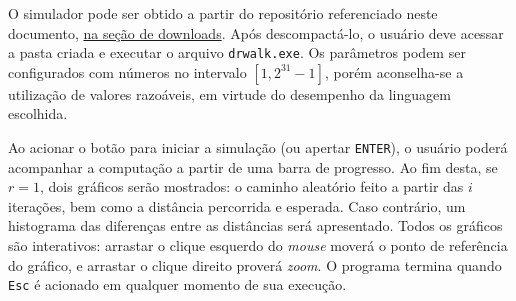 \documentclass{article}
\begin{document}
O simulador pode ser obtido a partir do repositório referenciado neste
documento, \href{https://github.com/zambonin/UFSC-INE5425/releases}{na seção de
downloads}. Após descompactá-lo, o usuário deve acessar a pasta criada e
executar o arquivo \texttt{drwalk.exe}. Os parâmetros podem ser configurados
com números no intervalo $[1, 2^{31} - 1]$, porém aconselha-se a utilização de
valores razoáveis, em virtude do desempenho da linguagem escolhida.
\vspace{2mm}

\noindent Ao acionar o botão para iniciar a simulação (ou apertar
\texttt{ENTER}), o usuário poderá acompanhar a computação a partir de uma
barra de progresso. Ao fim desta, se $r = 1$, dois gráficos serão mostrados:
o caminho aleatório feito a partir das $i$ iterações, bem como a distância
percorrida e esperada. Caso contrário, um histograma das diferenças entre as
distâncias será apresentado. Todos os gráficos são interativos: arrastar o
clique esquerdo do \emph{mouse} moverá o ponto de referência do gráfico, e
arrastar o clique direito proverá \emph{zoom}. O programa termina quando
\texttt{Esc} é acionado em qualquer momento de sua execução.
\end{document}
